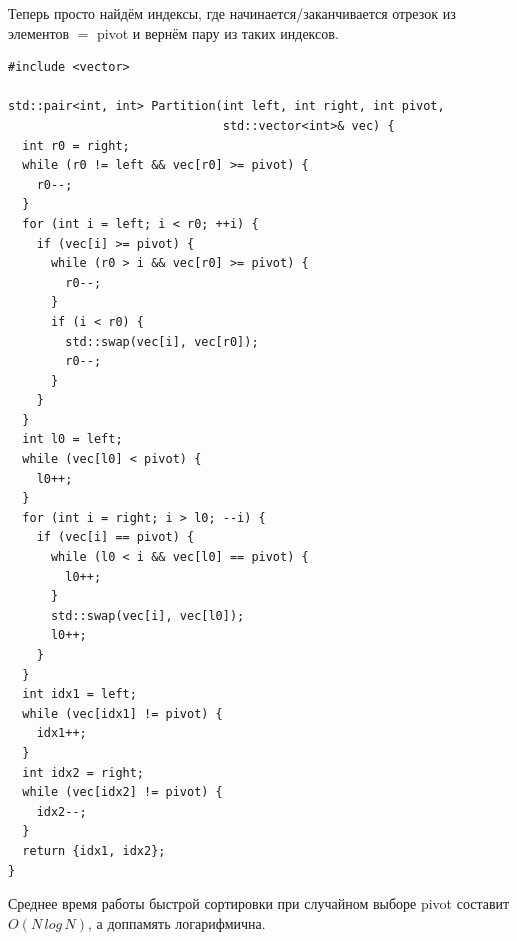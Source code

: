 Теперь просто найдём индексы, где начинается/заканчивается отрезок из элементов $=$ pivot и вернём пару из таких индексов.


\begin{lstlisting}
#include <vector>

std::pair<int, int> Partition(int left, int right, int pivot,
                              std::vector<int>& vec) {
  int r0 = right;
  while (r0 != left && vec[r0] >= pivot) {
    r0--;
  }
  for (int i = left; i < r0; ++i) {
    if (vec[i] >= pivot) {
      while (r0 > i && vec[r0] >= pivot) {
        r0--;
      }
      if (i < r0) {
        std::swap(vec[i], vec[r0]);
        r0--;
      }
    }
  }
  int l0 = left;
  while (vec[l0] < pivot) {
    l0++;
  }
  for (int i = right; i > l0; --i) {
    if (vec[i] == pivot) {
      while (l0 < i && vec[l0] == pivot) {
        l0++;
      }
      std::swap(vec[i], vec[l0]);
      l0++;
    }
  }
  int idx1 = left;
  while (vec[idx1] != pivot) {
    idx1++;
  }
  int idx2 = right;
  while (vec[idx2] != pivot) {
    idx2--;
  }
  return {idx1, idx2};
}
\end{lstlisting}

\Thbd Среднее время работы быстрой сортировки при случайном выборе pivot составит $O(N\,log\,N)$, а доппамять логарифмична.

\pagebreak